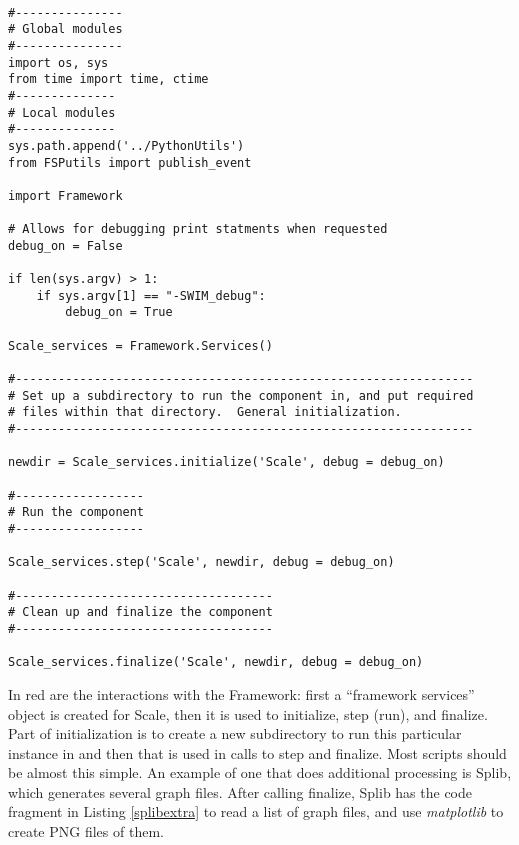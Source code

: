 \begin{lstlisting}[frame=single,
                       caption={SWIM\_runit file for Scale component in LSA},
                       label=scalerunit]

#---------------
# Global modules
#---------------
import os, sys
from time import time, ctime  
#--------------
# Local modules
#--------------
sys.path.append('../PythonUtils')
from FSPutils import publish_event

import Framework

# Allows for debugging print statments when requested
debug_on = False

if len(sys.argv) > 1:
    if sys.argv[1] == "-SWIM_debug":
        debug_on = True

Scale_services = Framework.Services()

#----------------------------------------------------------------
# Set up a subdirectory to run the component in, and put required
# files within that directory.  General initialization.
#----------------------------------------------------------------

newdir = Scale_services.initialize('Scale', debug = debug_on)

#------------------
# Run the component
#------------------

Scale_services.step('Scale', newdir, debug = debug_on)

#------------------------------------
# Clean up and finalize the component
#------------------------------------

Scale_services.finalize('Scale', newdir, debug = debug_on)

\end{lstlisting}
In red are the interactions with the Framework: first a ``framework services'' object
is created for Scale, then it is used to initialize, step (run), and finalize. 
Part of initialization is to create a new subdirectory to run this particular instance
in and then that is used in calls to step and finalize. Most scripts should be
almost this simple. An example of one that does additional processing is Splib,
which generates several graph files. After calling finalize, Splib has the
code fragment in Listing \ref{splibextra} to read a list of graph files, and use {\em matplotlib}
to create PNG files of them.
